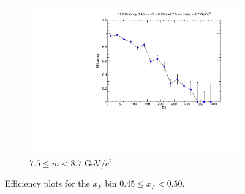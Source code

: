 \begin{figure}[p]
\begin{subfigure}[b]{0.32\textwidth}
        \includegraphics[width=\textwidth]{./kTrackerEfficiencyPlots/D2_Efficiency_xF9_mass10.pdf}
        \caption{$7.5 \leq m < 8.7$ GeV/$c^2$}
        \label{fig:xF9_mass10}
    \end{subfigure}
    \hfill
    \caption{Efficiency plots for the $x_F$ bin $0.45 \leq x_F < 0.50$.}
    \label{fig:xF9}
\end{figure}

\clearpage

